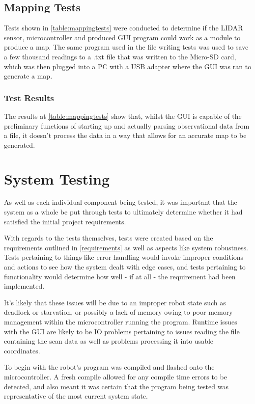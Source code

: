 			\subsection{Mapping Tests}
			Tests shown in \ref{table:mappingtests}	were conducted to determine if the LIDAR sensor, microcontroller and produced GUI program could work as a module to produce a map. The same program used in the file writing tests was used to save a few thousand readings to a .txt file that was written to the Micro-SD card, which was then plugged into a PC with a USB adapter where the GUI was ran to generate a map. 
				
				\subsubsection{Test Results}
				The results at \ref{table:mappingtests} show that, whilst the GUI is capable of the preliminary functions of starting up and actually parsing observational data from a file, it doesn't process the data in a way that allows for an accurate map to be generated.
			
		\section{System Testing}		
		As well as each individual component being tested, it was important that the system as a whole be put through tests to ultimately determine whether it had satisfied the initial project requirements.
			
		With regards to the tests themselves, tests were created based on the requirements outlined in \ref{requirements} as well as aspects like system robustness. Tests pertaining to things like error handling would invoke improper conditions and actions to see how the system dealt with edge cases, and tests pertaining to functionality would determine how well - if at all - the requirement had been implemented.
			
		It's likely that these issues will be due to an improper robot state such as deadlock or starvation, or possibly a lack of memory owing to poor memory management within the microcontroller running the program. Runtime issues with the GUI are likely to be IO problems pertaining to issues reading the file containing the scan data as well as problems processing it into usable coordinates. 
			
		To begin with the robot's program was compiled and flashed onto the microcontroller. A fresh compile allowed for any compile time errors to be detected, and also meant it was certain that the program being tested was representative of the most current system state.
		
